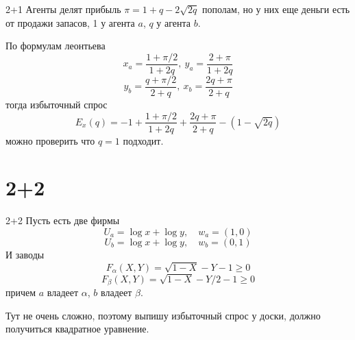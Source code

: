 \documentclass{beamer}
\begin{document}
\begin{frame}{2+1}
Агенты делят прибыль $\pi = 1 + q - 2\sqrt{2q}$ пополам, но у них еще деньги есть от продажи запасов, 1 у агента $a$, $q$ у агента $b$.

По формулам леонтьева
$$ x_a = \frac{1+\pi/2}{1+2q}, \ y_a = \frac{2+\pi}{1+2q}$$
$$ y_b = \frac{q+\pi/2}{2+q}, \ x_b = \frac{2q + \pi}{2+q}$$
тогда избыточный спрос
$$ E_x(q) = -1 +  \frac{1+\pi/2}{1+2q} + \frac{2q+\pi}{2+q} - (1-\sqrt{2q})$$
можно проверить что $q = 1$ подходит.
\end{frame}

\section{2+2}

\begin{frame}{2+2}
Пусть есть две фирмы
$$U_a = \log x + \log y, \quad w_a = (1,0)$$
$$U_b = \log x + \log y, \quad w_b = (0,1)$$
И заводы
$$ F_{\alpha}(X,Y) = \sqrt{1-X} - Y - 1 \geqslant 0$$
$$ F_{\beta}(X,Y) = \sqrt{1-X} - Y/2 - 1 \geqslant 0$$
причем $a$ владеет $\alpha$, $b$ владеет $\beta$.

Тут не очень сложно, поэтому выпишу избыточный спрос у доски, должно получиться квадратное уравнение.
\end{frame}
\end{document}
